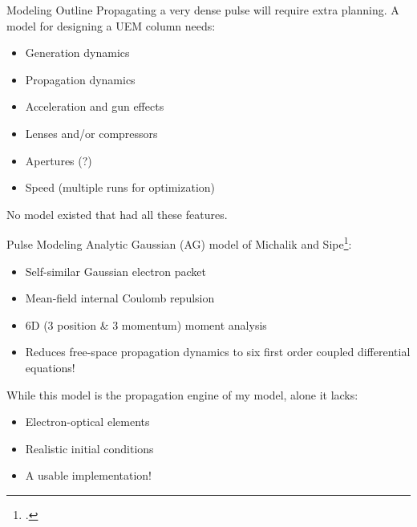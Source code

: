 \begin{frame}{Modeling Outline}
Propagating a very dense pulse will require extra planning. A model for designing a UEM column needs:
	\begin{itemize}[<+->]
	    \item Generation dynamics
		\item Propagation dynamics
		\item Acceleration and gun effects
		\item Lenses and/or compressors	
		\item Apertures (?)
		\item Speed (multiple runs for optimization)
	\end{itemize}
No model existed that had all these features.
\end{frame}

\begin{frame}{Pulse Modeling}
  Analytic Gaussian (AG) model of Michalik and Sipe\footcite{michalik_analytic_2006}: 
  \begin{itemize}
  \item<2-> Self-similar Gaussian electron packet
  \item<3-> Mean-field internal Coulomb repulsion 
  \item<4-> 6D (3 position \& 3 momentum) moment analysis
  \item<5->[$\Rightarrow$] Reduces free-space propagation dynamics to six first order coupled differential equations!
	\end{itemize}
    While this model is the propagation engine of my model, alone it lacks:
    \begin{itemize}
      \item<6-> Electron-optical elements
      \item<7-> Realistic initial conditions
      \item<8-> A usable implementation!
    \end{itemize}
\end{frame}

